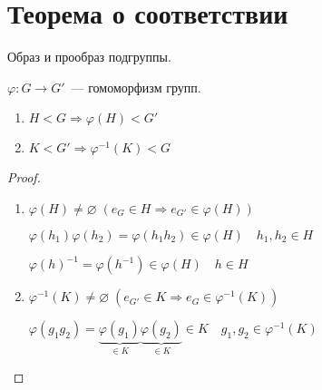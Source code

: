 \section{Теорема о соответствии}

\begin{theorem-non}
    Образ и прообраз подгруппы.

    $\varphi: G \to G'$~--- гомоморфизм групп.

    \begin{enumerate}
        \item $H < G \Longrightarrow \varphi(H) < G'$
        \item $K < G' \Longrightarrow \varphi^{-1}(K) < G$
    \end{enumerate}

    \begin{proof} \quad
        
        \begin{enumerate}
            \item 
            $\varphi(H) \neq \varnothing \; (e_G \in H \Rightarrow e_{G'} \in \varphi(H))$
        
            $\varphi(h_1) \varphi(h_2) = \varphi(h_1h_2) \in \varphi(H) \quad h_1, h_2 \in H$

            $\varphi(h)^{-1} = \varphi(h^{-1}) \in \varphi(H) \quad h \in H$
            \item 
            $\varphi^{-1}(K) \neq \varnothing \; (e_{G'} \in K \Rightarrow e_{G} \in \varphi^{-1}(K))$

            $\varphi(g_1g_2) = \underbrace{\varphi(g_1)}_{\text{$\in K$}} \underbrace{\varphi(g_2)}_{\text{$\in K$}} \in K \quad g_1, g_2 \in \varphi^{-1}(K)$
        \end{enumerate}
        \end{proof}

\end{theorem-non}

